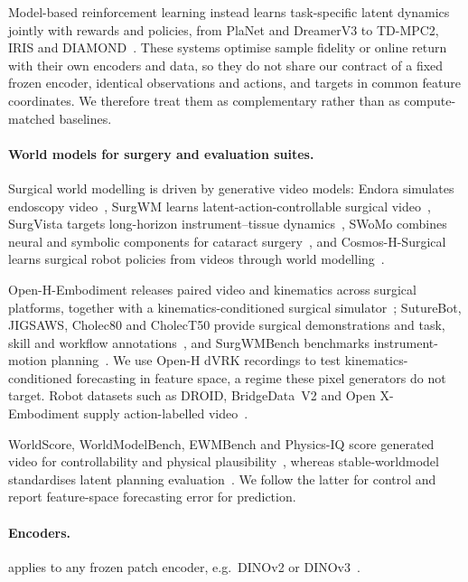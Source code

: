 Model-based reinforcement learning instead learns task-specific latent dynamics jointly with rewards and policies, from
PlaNet and DreamerV3 to TD-MPC2, IRIS and DIAMOND~\citep{hafner2019planet,hafner2025dreamerv3,hansen2024tdmpc2,micheli2023iris,alonso2024diamond}.
These systems optimise sample fidelity or online return with their own encoders and data, so they do not share our
contract of a fixed frozen encoder, identical observations and actions, and targets in common feature coordinates. We
therefore treat them as complementary rather than as compute-matched baselines.
\paragraph{World models for surgery and evaluation suites.}
Surgical world modelling is driven by generative video models: Endora simulates endoscopy video~\citep{li2024endora},
SurgWM learns latent-action-controllable surgical video~\citep{koju2025surgwm}, SurgVista targets long-horizon
instrument--tissue dynamics~\citep{pan2026surgvista}, SWoMo combines neural and symbolic components for cataract
surgery~\citep{sivakumar2026swomo}, and Cosmos-H-Surgical learns surgical robot policies from videos through world
modelling~\citep{he2025cosmoshsurgical}.

Open-H-Embodiment releases paired video and kinematics across surgical platforms,
together with a kinematics-conditioned surgical simulator~\citep{openh2026embodiment}; SutureBot, JIGSAWS, Cholec80 and
CholecT50 provide surgical demonstrations and task, skill and workflow
annotations~\citep{haworth2025suturebot,gao2014jigsaws,twinanda2017endonet,nwoye2022rendezvous}, and SurgWMBench
benchmarks instrument-motion planning~\citep{liu2026surgwmbench}. We use Open-H dVRK recordings to test
kinematics-conditioned forecasting in feature space, a regime these pixel generators do not target. Robot datasets such
as DROID, BridgeData~V2 and Open X-Embodiment supply action-labelled video~\citep{khazatsky2024droid,walke2023bridgedata,oneill2024openx}.

WorldScore, WorldModelBench, EWMBench and Physics-IQ score generated video for controllability and physical
plausibility~\citep{duan2025worldscore,li2025worldmodelbench,yue2025ewmbench,motamed2026physicsiq}, whereas
stable-worldmodel standardises latent planning evaluation~\citep{maes2026stable}. We follow the latter for control and
report feature-space forecasting error for prediction.
\paragraph{Encoders.} \ours{} applies to any frozen patch encoder, e.g.\ DINOv2 or DINOv3~\citep{oquab2023dinov2,simeoni2025dinov3}.

